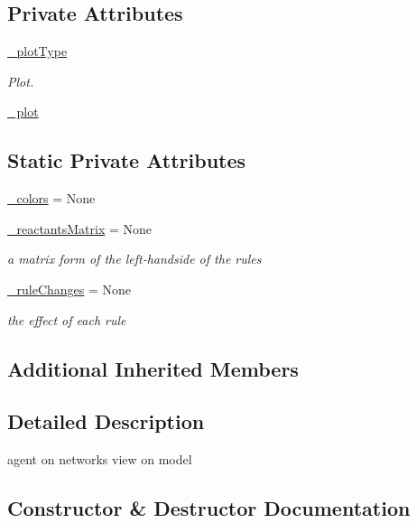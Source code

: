 \subsection*{Private Attributes}
\begin{DoxyCompactItemize}
\item 
\hyperlink{class_mu_mo_t_1_1_mu_mo_t_s_s_a_view_a5feff4ca83ee97d6e09874496a4975d4}{\+\_\+plot\+Type}
\begin{DoxyCompactList}\small\item\em Plot. \end{DoxyCompactList}\item 
\hyperlink{class_mu_mo_t_1_1_mu_mo_t_s_s_a_view_acdfed4631d661bc2ad215c25a2ed8260}{\+\_\+plot}
\end{DoxyCompactItemize}
\subsection*{Static Private Attributes}
\begin{DoxyCompactItemize}
\item 
\hyperlink{class_mu_mo_t_1_1_mu_mo_t_s_s_a_view_a6aaed74c935ed5380691798f75527a18}{\+\_\+colors} = None
\item 
\hyperlink{class_mu_mo_t_1_1_mu_mo_t_s_s_a_view_a2fc08b0021064bc60e2a9349157357bc}{\+\_\+reactants\+Matrix} = None
\begin{DoxyCompactList}\small\item\em a matrix form of the left-\/handside of the rules \end{DoxyCompactList}\item 
\hyperlink{class_mu_mo_t_1_1_mu_mo_t_s_s_a_view_a6a882ef2523ac168ac8a5c87e78b8ed0}{\+\_\+rule\+Changes} = None
\begin{DoxyCompactList}\small\item\em the effect of each rule \end{DoxyCompactList}\end{DoxyCompactItemize}
\subsection*{Additional Inherited Members}


\subsection{Detailed Description}
agent on networks view on model 

\subsection{Constructor \& Destructor Documentation}
\mbox{\label{class_mu_mo_t_1_1_mu_mo_t_s_s_a_view_a56403a3c4cf6f48d384a21f5ecb01918}} 
